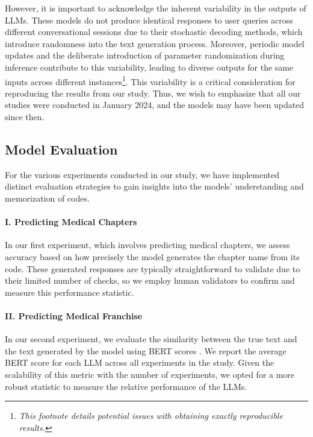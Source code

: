 \documentclass[11pt]{article}
\theoremstyle{plain}
\theoremstyle{definition}
\theoremstyle{remark}
\begin{document}
However, it is important to acknowledge the inherent variability in the outputs of LLMs. These models do not produce identical responses to user queries across different conversational sessions due to their stochastic decoding methods, which introduce randomness into the text generation process. Moreover, periodic model updates and the deliberate introduction of parameter randomization during inference contribute to this variability, leading to diverse outputs for the same inputs across different instances\footnote{\textit{This footnote details potential issues with obtaining exactly reproducible results.}}. This variability is a critical consideration for reproducing the results from our study. Thus, we wish to emphasize that all our studies were conducted in January 2024, and the models may have been updated since then.

\subsection{Model Evaluation}
For the various experiments conducted in our study, we have implemented distinct evaluation strategies to gain insights into the models' understanding and memorization of codes.

\paragraph{I. Predicting Medical Chapters}
In our first experiment, which involves predicting medical chapters, we assess accuracy based on how precisely the model generates the chapter name from its code. These generated responses are typically straightforward to validate due to their limited number of checks, so we employ human validators to confirm and measure this performance statistic.

\paragraph{II. Predicting Medical Franchise}
In our second experiment, we evaluate the similarity between the true text and the text generated by the model using BERT scores \citep{zhang2019bertscore}. We report the average BERT score for each LLM across all experiments in the study. Given the scalability of this metric with the number of experiments, we opted for a more robust statistic to measure the relative performance of the LLMs.
\end{document}
